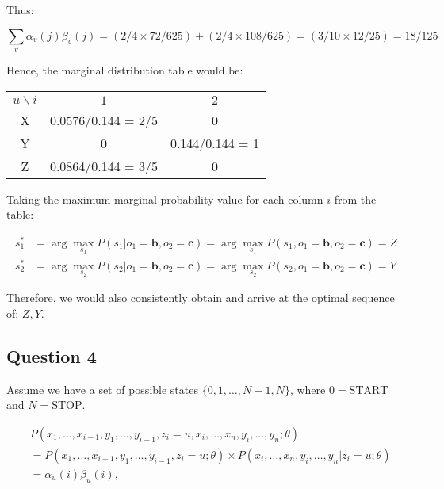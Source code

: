 \documentclass[11pt,fancychapters]{article}
\begin{document}
Thus:

\begin{equation*}
	\sum_{v} \alpha_v(j) \beta_v(j) = (2/4 \times 72/625) + (2/4 \times 108/625) = (3/10 \times 12/25) = 18/125
\end{equation*}

Hence, the marginal distribution table would be:

\begin{table}[h!]
	\centering
	\begin{tabular}{|c | c | c |} 
		\hline
		$u \backslash i$ & $1$ & $2$ \\
		\hline
		X & 0.0576/0.144 = 2/5 & 0 \\
		\hline
		Y & 0 & 0.144/0.144 = 1 \\
		\hline
		Z & 0.0864/0.144 = 3/5 & 0 \\ [1ex]
		\hline
	\end{tabular}
\end{table}

Taking the maximum marginal probability value for each column $i$ from the table:

\begin{align*}
	s_1^* &= \arg \max_{s_1}P(s_1 | o_1 = \textbf{b}, o_2 = \textbf{c}) = \arg \max_{s_1}P(s_1, o_1 = \textbf{b}, o_2 = \textbf{c}) = Z \\
	s_2^* &= \arg \max_{s_2}P(s_2 | o_1 = \textbf{b}, o_2 = \textbf{c}) = \arg \max_{s_2}P(s_2, o_1 = \textbf{b}, o_2 = \textbf{c}) = Y
\end{align*}

Therefore, we would also consistently obtain and arrive at the optimal sequence of: $Z, Y$.

\subsection*{Question 4}

Assume we have a set of possible states $\{ 0, 1, \ldots, N - 1, N \}$, where $0 = \text{START}$ and $N = \text{STOP}$.

\begin{align*}
	&P(x_1, \ldots, x_{i-1}, y_1, \ldots, y_{i-1}, z_i = u, x_i, \ldots, x_n, y_i, \ldots, y_n; \theta) \\
	&= P(x_1, \ldots, x_{i-1}, y_1, \ldots, y_{i-1}, z_i = u; \theta) \times P(x_i, \ldots, x_n, y_i, \ldots, y_n | z_i = u; \theta) \\
	&= \alpha_u(i) \beta_u(i),
\end{align*}
\end{document}
